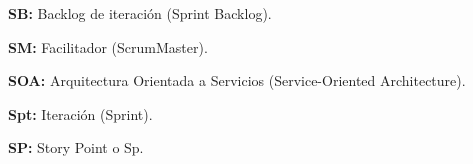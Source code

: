 \begin{description}
  \item {\textbf{SB:} Backlog de iteración (Sprint Backlog).}
  
  \item {\textbf{SM:} Facilitador (ScrumMaster).}
  
  \item {\textbf{SOA:} Arquitectura Orientada a Servicios (Service-Oriented Architecture).}
  
  \item {\textbf{Spt:} Iteración (Sprint).}
  
  \item {\textbf{SP:} Story Point o Sp.}
  
\end{description}
  

